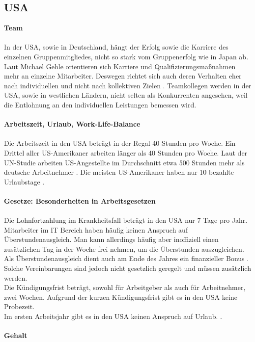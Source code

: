 	\subsection{USA}
	\textbf{Team}\\
	\\
	In der USA, sowie in Deutschland, hängt der Erfolg sowie die Karriere des einzelnen Gruppenmitgliedes, nicht so stark vom Gruppenerfolg wie in Japan ab. Laut Michael Gehle orientieren sich Karriere und Qualifizierungsmaßnahmen mehr an einzelne Mitarbeiter. Deswegen richtet sich auch deren Verhalten eher nach individuellen und nicht nach kollektiven Zielen \cite[233]{3LaenderVergl}. 
	Teamkollegen werden in der USA, sowie in westlichen Ländern, nicht selten als Konkurrenten angesehen, weil die Entlohnung an den individuellen Leistungen bemessen wird. \\ \\
		\textbf{Arbeitszeit, Urlaub, Work-Life-Balance}\\
		\\
	Die Arbeitszeit in den USA beträgt in der Regal 40 Stunden pro Woche. 
	Ein Drittel aller US-Amerikaner arbeiten länger als 40 Stunden pro Woche.
	Laut der UN-Studie arbeiten US-Angestellte im Durchschnitt etwa 500 Stunden mehr als deutsche Arbeitnehmer \cite{ArbeitsumgUSA}. Die meisten US-Amerikaner haben nur 10 bezahlte Urlaubstage \cite{InfoUSArbVertr}.\\ \\
	\textbf{Gesetze: Besonderheiten in Arbeitsgesetzen}\\
		\\
		Die Lohnfortzahlung im Krankheitsfall beträgt in den USA nur 7 Tage pro Jahr. 
		Mitarbeiter im IT Bereich haben häufig keinen Anspruch auf Überstundenausgleich. Man kann allerdings häufig aber inoffiziell einen zusätzlichen Tag in der Woche frei nehmen, um die Überstunden auszugleichen. Als Überstundenausgleich dient auch am Ende des Jahres ein finanzieller Bonus \cite{InfoUSArbVertr}.
		Solche Vereinbarungen sind jedoch nicht gesetzlich geregelt und müssen zusätzlich werden.\\
		Die Kündigungsfrist beträgt, sowohl für Arbeitgeber als auch für 
		Arbeitnehmer, zwei Wochen. Aufgrund der kurzen Kündigungsfrist gibt es in den USA keine Probezeit.\\
		Im ersten Arbeitsjahr gibt es in den USA keinen Anspruch auf Urlaub. \cite{USA_Tipps}.
		\\ \\
	\textbf{Gehalt}\\
